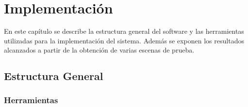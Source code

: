 \chapter{Implementación}

En este capítulo se describe la estructura general del software y las herramientas utilizadas para la implementación del sistema. Además se exponen los resultados alcanzados a partir de la obtención de varias escenas de prueba.

\section{Estructura General}


\subsection{Herramientas}
